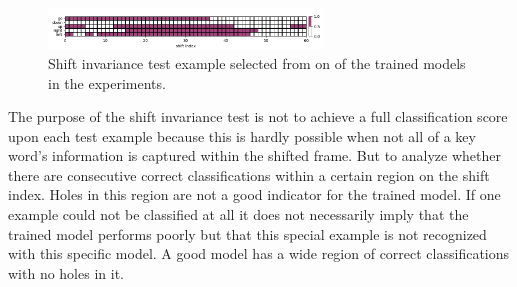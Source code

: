 \begin{figure}[!ht]
  \centering
    \includegraphics[width=0.65\textwidth]{./5_exp/figs/exp_fs_cepstral_tb_shift_conv-jim_mfcc12_norm0.png}
  \caption{Shift invariance test example selected from on of the trained models in the experiments.}
  \label{fig:exp_details_tb_shift}
\end{figure}
\FloatBarrier
\noindent
The purpose of the shift invariance test is not to achieve a full classification score upon each test example because this is hardly possible when not all of a key word's information is captured within the shifted frame.
But to analyze whether there are consecutive correct classifications within a certain region on the shift index.
Holes in this region are not a good indicator for the trained model.
If one example could not be classified at all it does not necessarily imply that the trained model performs poorly but that this special example is not recognized with this specific model.
A good model has a wide region of correct classifications with no holes in it.



